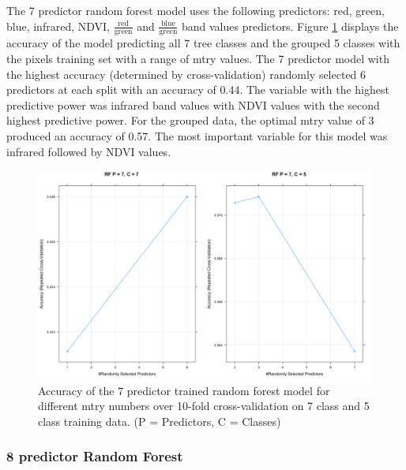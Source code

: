 \documentclass[12pt,twoside]{reedthesis}
\begin{document}
The 7 predictor random forest model uses the following predictors: red, green, blue, infrared, NDVI, \(\frac{\mbox{red}}{\mbox{green}}\) and \(\frac{\mbox{blue}}{\mbox{green}}\) band values predictors. Figure \ref{fig:rf7} displays the accuracy of the model predicting all 7 tree classes and the grouped 5 classes with the pixels training set with a range of mtry values. The 7 predictor model with the highest accuracy (determined by cross-validation) randomly selected 6 predictors at each split with an accuracy of 0.44. The variable with the highest predictive power was infrared band values with NDVI values with the second highest predictive power. For the grouped data, the optimal mtry value of 3 produced an accuracy of 0.57. The most important variable for this model was infrared followed by NDVI values.
\begin{figure}

{\centering \includegraphics[width=0.9\linewidth]{figure/rf7_mtry} 

}

\caption{Accuracy of the 7 predictor trained random forest model for different mtry numbers over 10-fold cross-validation on 7 class and 5 class training data. (P = Predictors, C = Classes)}\label{fig:rf7}
\end{figure}
\hypertarget{predictor-random-forest-1}{%
\subsubsection{8 predictor Random Forest}\label{predictor-random-forest-1}}
\end{document}
